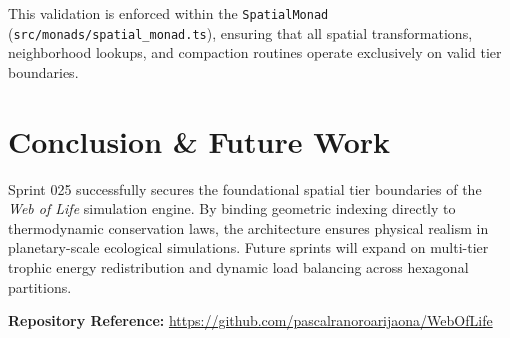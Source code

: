 \documentclass[11pt, a4paper]{article}
\begin{document}
This validation is enforced within the \texttt{SpatialMonad} (\texttt{src/monads/spatial\_monad.ts}), ensuring that all spatial transformations, neighborhood lookups, and compaction routines operate exclusively on valid tier boundaries.

\section{Conclusion \& Future Work}
Sprint 025 successfully secures the foundational spatial tier boundaries of the \emph{Web of Life} simulation engine. By binding geometric indexing directly to thermodynamic conservation laws, the architecture ensures physical realism in planetary-scale ecological simulations. Future sprints will expand on multi-tier trophic energy redistribution and dynamic load balancing across hexagonal partitions.

\vspace{1em}
\noindent\textbf{Repository Reference:} \url{https://github.com/pascalranoroarijaona/WebOfLife}
\end{document}
